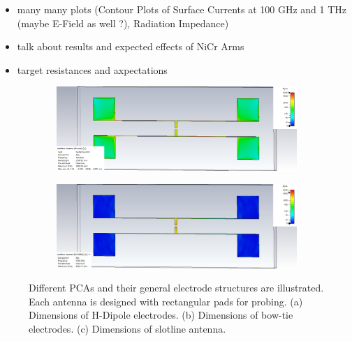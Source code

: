 \begin{itemize}
	\item many many plots (Contour Plots of Surface Currents at 100 GHz and 1 THz (maybe E-Field as well ?),
	Radiation Impedance)
	\item talk about results and expected effects of NiCr Arms 
	\item target resistances and axpectations
\end{itemize}

\begin{figure}[ht]
    \centering
    \hfill
    \begin{subfigure}[b]{1\textwidth}
        \centering
        \includegraphics[width=\textwidth]{figures/contour_plots/Contour_ref_0.1THz_SC.pdf}
        \caption{}
        \label{contour_ref_100GHz}
    \end{subfigure}
    \hfill
    \begin{subfigure}[b]{1\textwidth}
        \centering
        \includegraphics[width=\textwidth]{figures/contour_plots/Contour_ref_1THz_SC.pdf}
        \caption{}
        \label{contour_ref_1THz}
    \end{subfigure}
    \caption{Different PCAs and their general electrode structures are illustrated. Each antenna is designed with rectangular pads for probing. (a) Dimensions of H-Dipole electrodes. (b) Dimensions of bow-tie electrodes. (c) Dimensions of slotline antenna.}
    \label{electrodes_main}
\end{figure}


